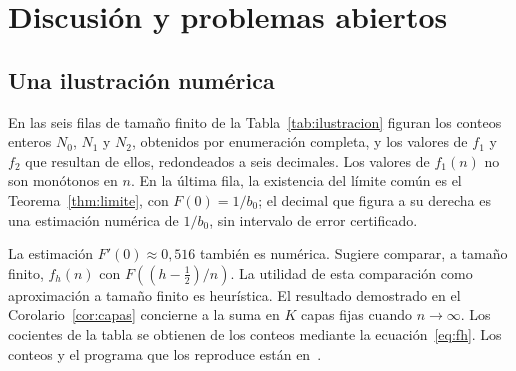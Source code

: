\section{Discusión y problemas abiertos}\label{sec:discusion}

\subsection{Una ilustración numérica}

En las seis filas de tamaño finito de la Tabla~\ref{tab:ilustracion} figuran los conteos enteros
$N_0$, $N_1$ y $N_2$, obtenidos por enumeración completa, y los valores de $f_1$ y $f_2$ que
resultan de ellos, redondeados a seis decimales. Los valores de $f_1(n)$ no son monótonos en
$n$. En la última fila, la existencia del límite común es el Teorema~\ref{thm:limite}, con
$F(0)=1/b_0$; el decimal que figura a su derecha es una estimación numérica de $1/b_0$, sin
intervalo de error certificado.

La estimación $F'(0)\approx0{,}516$ también es numérica. Sugiere comparar, a tamaño
finito, $f_h(n)$ con $F((h-\tfrac12)/n)$. La utilidad de esta comparación como
aproximación a tamaño finito es heurística. El resultado demostrado en el
Corolario~\ref{cor:capas} concierne a la suma en $K$ capas fijas cuando $n\to\infty$.
Los cocientes de la tabla se obtienen de los conteos mediante la ecuación~\eqref{eq:fh}.
Los conteos y el programa que los reproduce están en~\cite{Codigo}.

